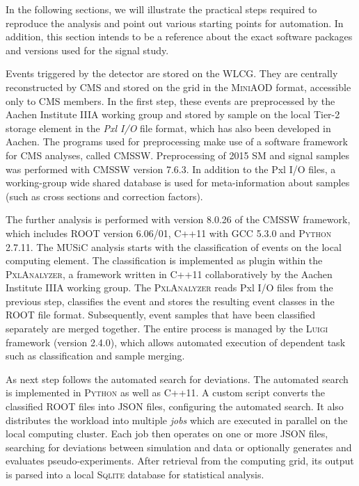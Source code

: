 In the following sections, we will illustrate the practical steps required to reproduce the analysis and point out various starting points for automation. In addition, this section intends to be a reference about the exact software packages and versions used for the signal study.

Events triggered by the detector are stored on the \ac{WLCG}. They are centrally reconstructed by \ac{CMS} and stored on the grid in the \textsc{MiniAOD} format\cite{Petrucciani:MiniAODNew}, accessible only to \ac{CMS} members. In the first step, these events are preprocessed by the Aachen Institute IIIA working group and stored by sample on the local Tier-2 storage element in the \emph{Pxl I/O} file format\cite{Bretz:DevelopmentEnvironmentVisual}, which has also been developed in Aachen. The programs used for preprocessing make use of a software framework for \ac{CMS} analyses, called \textsc{CMSSW}. Preprocessing of 2015 \ac{SM} and signal samples was performed with \textsc{CMSSW} version 7.6.3. In addition to the Pxl I/O files, a working-group wide shared database is used for meta-information about samples (such as cross sections and correction factors).

The further analysis is performed with version 8.0.26 of the \textsc{CMSSW} framework, which includes \textsc{ROOT} version 6.06/01\cite{Brun:ROOTobjectoriented}, C++11 with \textsc{GCC} 5.3.0 and \textsc{Python} 2.7.11\cite{Oliphant:PythonScientificComputing}.
The \ac{MUSiC} analysis starts with the classification of events on the local computing element. The classification is implemented as plugin within the \textsc{PxlAnalyzer}, a framework written in C++11 collaboratively by the Aachen Institute IIIA working group. The \textsc{PxlAnalyzer} reads Pxl I/O files from the previous step, classifies the event and stores the resulting event classes in the \textsc{ROOT} file format. Subsequently, event samples that have been classified separately are merged together. The entire process is managed by the \textsc{Luigi} framework \cite{Spotify:Luigi}(version 2.4.0), which allows automated execution of dependent task such as classification and sample merging.

As next step follows the automated search for deviations. The automated search is implemented in \textsc{Python} as well as C++11. A custom script converts the classified \textsc{ROOT} files into JSON files, configuring the automated search. It also distributes the workload into multiple \emph{jobs} which are executed in parallel on the local computing cluster. Each job then operates on one or more JSON files, searching for deviations between simulation and data or optionally generates and evaluates pseudo-experiments.
After retrieval from the computing grid, its output is parsed into a local \textsc{Sqlite} database for statistical analysis.

